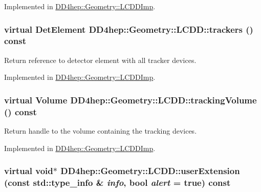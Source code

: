 Implemented in \hyperlink{class_d_d4hep_1_1_geometry_1_1_l_c_d_d_imp_af37d163b4c62d1ef1602555d39e0eff8}{DD4hep::Geometry::LCDDImp}.\hypertarget{class_d_d4hep_1_1_geometry_1_1_l_c_d_d_a23b3868f3b09adccc62799612285c7db}{
\subsubsection[{trackers}]{\setlength{\rightskip}{0pt plus 5cm}virtual {\bf DetElement} DD4hep::Geometry::LCDD::trackers () const}}
\label{class_d_d4hep_1_1_geometry_1_1_l_c_d_d_a23b3868f3b09adccc62799612285c7db}


Return reference to detector element with all tracker devices. 

Implemented in \hyperlink{class_d_d4hep_1_1_geometry_1_1_l_c_d_d_imp_a0456a61fe57ba6e772da7668a26e4eb9}{DD4hep::Geometry::LCDDImp}.\hypertarget{class_d_d4hep_1_1_geometry_1_1_l_c_d_d_a351b289056485f960e9121382018c92b}{
\subsubsection[{trackingVolume}]{\setlength{\rightskip}{0pt plus 5cm}virtual {\bf Volume} DD4hep::Geometry::LCDD::trackingVolume () const}}
\label{class_d_d4hep_1_1_geometry_1_1_l_c_d_d_a351b289056485f960e9121382018c92b}


Return handle to the volume containing the tracking devices. 

Implemented in \hyperlink{class_d_d4hep_1_1_geometry_1_1_l_c_d_d_imp_afb0ba5d32423a9a36a2d02e5dc8d63ef}{DD4hep::Geometry::LCDDImp}.\hypertarget{class_d_d4hep_1_1_geometry_1_1_l_c_d_d_a699d446afe8b33487cdce57d4e2f26c6}{
\subsubsection[{userExtension}]{\setlength{\rightskip}{0pt plus 5cm}virtual void$\ast$ DD4hep::Geometry::LCDD::userExtension (const std::type\_\-info \& {\em info}, \/  bool {\em alert} = {\ttfamily true}) const}}
\label{class_d_d4hep_1_1_geometry_1_1_l_c_d_d_a699d446afe8b33487cdce57d4e2f26c6}


